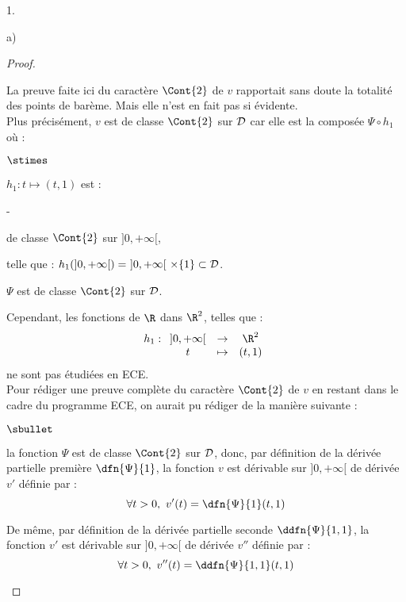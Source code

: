 \begin{noliste}{1.}
\begin{noliste}{a)}
\begin{proof}
   
   
   
   
   \newpage
   
   
   
   
   \begin{remark}
    La preuve faite ici du caractère $\Cont{2}$ de $v$ rapportait sans 
    doute la totalité des points de barème.
    Mais elle n'est en fait pas si évidente.\\
    Plus précisément, $v$ est de classe $\Cont{2}$ sur 
    ${\cal D}$ car elle est la composée $\Psi \circ h_1$ où :
    \begin{noliste}{$\stimes$}
      \item $h_1:t \mapsto (t,1)$ est :
      \begin{noliste}{-}
      \item de classe $\Cont{2}$ sur $]0,+\infty[$,
      \item telle que : $h_1(]0,+\infty[) = \ ]0,+\infty[ \ \times \{1\}
      \subset {\cal D}$.
      \end{noliste}
      \item $\Psi$ est de classe $\Cont{2}$ sur ${\cal D}$.
    \end{noliste}
    Cependant, les fonctions de $\R$ dans $\R^2$, telles que :
    \[
    h_1:
    \begin{array}[t]{ccc}
     ]0,+\infty[ & \to & \R^2\\
     t & \mapsto & (t,1)
    \end{array}
    \]
    ne sont pas étudiées en ECE.\\
    Pour rédiger une preuve complète du caractère $\Cont{2}$ de $v$
    en restant dans le cadre du programme ECE, on aurait pu rédiger de 
    la manière suivante :
    \begin{noliste}{$\sbullet$}
      \item la fonction $\Psi$ est de classe $\Cont{2}$ sur ${\cal D}$,
      donc, par définition de la dérivée partielle première 
      $\dfn{\Psi}{1}$, la fonction $v$ est dérivable sur $]0,+\infty[$
      de dérivée $v'$ définie par :
      \[
       \forall t>0, \ v'(t) = \dfn{\Psi}{1}(t,1)
      \]
      
      \item De même, par définition de la dérivée partielle 
      seconde $\ddfn{\Psi}{1,1}$, la fonction $v'$ est dérivable
      sur $]0,+\infty[$ de dérivée $v''$ définie par :
      \[
       \forall t>0, \ v''(t) = \ddfn{\Psi}{1,1}(t,1)
      \]
      

\end{noliste}
\end{remark}
\end{proof}
\end{noliste}
\end{noliste}

